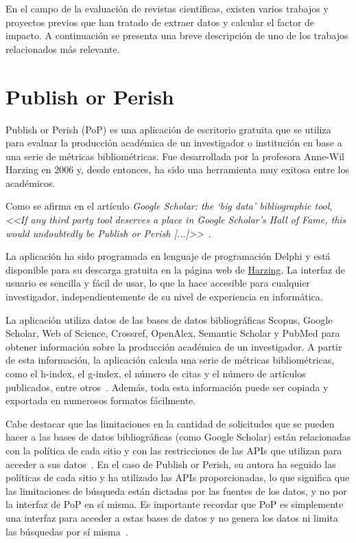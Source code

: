
En el campo de la evaluación de revistas científicas, existen varios trabajos y proyectos previos que han tratado de extraer datos y calcular el factor de impacto. A continuación se presenta una breve descripción de uno de los trabajos relacionados más relevante.

\section{Publish or Perish}
\label{sec:publish or perish}

Publish or Perish (PoP) es una aplicación de escritorio gratuita que se utiliza para evaluar la producción académica de un investigador o institución en base a una serie de métricas bibliométricas. Fue desarrollada por la profesora Anne-Wil Harzing en 2006 y, desde entonces, ha sido una herramienta muy exitosa entre los académicos.

Como se afirma en el artículo \textit{Google Scholar: the ‘big data’ bibliographic tool}, \textit{<<If any third party tool deserves a place in Google Scholar’s Hall of Fame, this would undoubtedly be Publish or Perish [...]>>}~\cite{lopez2017}.

La aplicación ha sido programada en lenguaje de programación Delphi y está disponible para su descarga gratuita en la página web de 
\href{https://harzing.com/resources/publish-or-perish/}{Harzing}. La interfaz de usuario es sencilla y fácil de usar, lo que la hace accesible para cualquier investigador, independientemente de su nivel de experiencia en informática.

La aplicación utiliza datos de las bases de datos bibliográficas Scopus, Google Scholar, Web of Science, Crossref, OpenAlex, Semantic Scholar y PubMed para obtener información sobre la producción académica de un investigador. A partir de esta información, la aplicación calcula una serie de métricas bibliométricas, como el h-index, el g-index, el número de citas y el número de artículos publicados, entre otros~\cite{harzing2010}. Además, toda esta información puede ser copiada y exportada en numerosos formatos fácilmente.


Cabe destacar que las limitaciones en la cantidad de solicitudes que se pueden hacer a las bases de datos bibliográficas (como Google Scholar) están relacionadas con la política de cada sitio y con las restricciones de las APIs que utilizan para acceder a sus datos~\cite{harzing2010}. En el caso de Publish or Perish, su autora ha seguido las políticas de cada sitio y ha utilizado las APIs proporcionadas, lo que significa que las limitaciones de búsqueda están dictadas por las fuentes de los datos, y no por la interfaz de PoP en sí misma. Es importante recordar que PoP es simplemente una interfaz para acceder a estas bases de datos y no genera los datos ni limita las búsquedas por sí misma~\cite{pop2007}.

